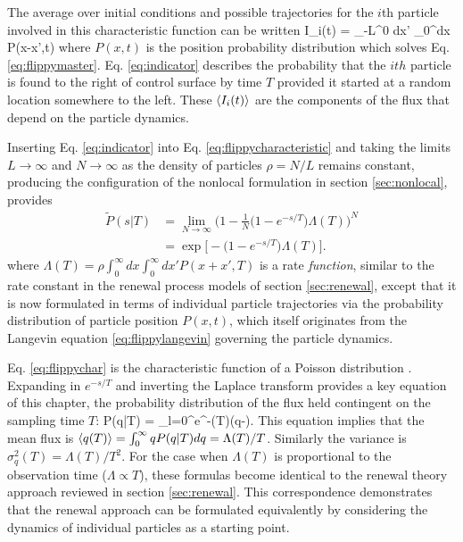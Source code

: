 The average over initial conditions and possible trajectories for the $i$th particle involved in this characteristic function can be written
\be \bra I_i(t) \ket = \int_{-L}^0 dx' \int_0^\infty dx P(x-x',t) \label{eq:indicator} \ee
where $P(x,t)$ is the position probability distribution which solves Eq. \ref{eq:flippymaster}.
Eq. \ref{eq:indicator} describes the probability that the $ith$ particle is found to the right of control surface by time $T$ provided it started at a random location somewhere to the left.
These $\langle I_i(t) \rangle$ are the components of the flux that depend on the particle dynamics. 

Inserting Eq. \ref{eq:indicator} into Eq. \ref{eq:flippycharacteristic} and taking the limits $L\rightarrow \infty$ and $N \rightarrow \infty$ as the density of particles $\rho = N/L$ remains constant, producing the configuration of the nonlocal formulation in section \ref{sec:nonlocal}, provides
\begin{align} \tilde{P}(s|T) &= \lim_{N \rightarrow \infty} \Big(1 - \frac{1}{N}\big(1-e^{-s/T}\big)\Lambda(T) \Big)^N \\ &= \exp \Big[ -\big(1-e^{-s/T}\big)\Lambda(T) \Big]. \label{eq:flippychar} \end{align}
where $\Lambda(T) = \rho \int_0^\infty dx \int_0^\infty dx' P(x+x',T)$ is a rate \textit{function}, similar to the rate constant in the renewal process models of section \ref{sec:renewal}, except that it is now formulated in terms of individual particle trajectories via the probability distribution of particle position $P(x,t)$, which itself originates from the Langevin equation \ref{eq:flippylangevin} governing the particle dynamics.

Eq. \ref{eq:flippychar} is the characteristic function of a Poisson distribution \citep{Cox1965}.
Expanding in $e^{-s/T}$ and inverting the Laplace transform provides a key equation of this chapter, the probability distribution of the flux held contingent on the sampling time $T$:
\be P(q|T) = \sum_{l=0}^\infty {}e^{-\Lambda(T)}\delta(q-). \label{eq:flippydist}\ee
This equation implies that the mean flux is $\langle q(T) \rangle = \int_0^\infty q P(q|T) dq = \Lambda(T)/T$. Similarly the variance is $\sigma_q^2(T) = \Lambda(T)/T^2$. For the case when $\Lambda(T)$ is proportional to the observation time ($\Lambda \propto T$), these formulas become identical to the renewal theory approach reviewed in section \ref{sec:renewal}.
This correspondence demonstrates that the renewal approach can be formulated equivalently by considering the dynamics of individual particles as a starting point.

